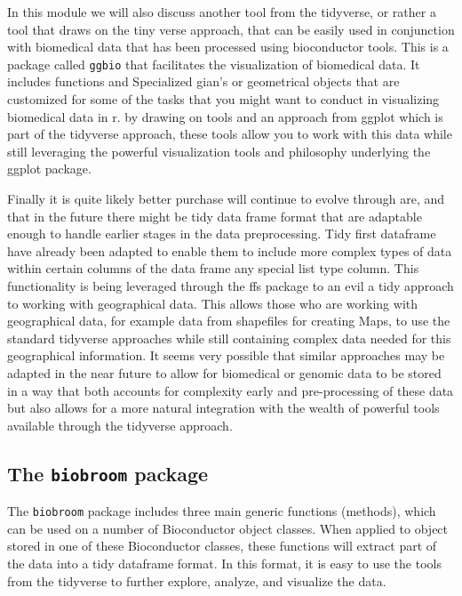 \documentclass[]{tufte-book}
\begin{document}
In this module we will also discuss another tool from the tidyverse, or rather a
tool that draws on the tiny verse approach, that can be easily used in
conjunction with biomedical data that has been processed using bioconductor
tools. This is a package called \texttt{ggbio} that facilitates the visualization of
biomedical data. It includes functions and Specialized gian's or geometrical
objects that are customized for some of the tasks that you might want to conduct
in visualizing biomedical data in r. by drawing on tools and an approach from
ggplot which is part of the tidyverse approach, these tools allow you to work
with this data while still leveraging the powerful visualization tools and
philosophy underlying the ggplot package.

Finally it is quite likely better purchase will continue to evolve through are,
and that in the future there might be tidy data frame format that are adaptable
enough to handle earlier stages in the data preprocessing. Tidy first dataframe
have already been adapted to enable them to include more complex types of data
within certain columns of the data frame any special list type column. This
functionality is being leveraged through the ffs package to an evil a tidy
approach to working with geographical data. This allows those who are working
with geographical data, for example data from shapefiles for creating Maps, to
use the standard tidyverse approaches while still containing complex data needed
for this geographical information. It seems very possible that similar
approaches may be adapted in the near future to allow for biomedical or genomic
data to be stored in a way that both accounts for complexity early and
pre-processing of these data but also allows for a more natural integration with
the wealth of powerful tools available through the tidyverse approach.

\hypertarget{the-biobroom-package}{%
\subsection{\texorpdfstring{The \texttt{biobroom} package}{The biobroom package}}\label{the-biobroom-package}}

The \texttt{biobroom} package includes three main generic functions (methods), which
can be used on a number of Bioconductor object classes. When applied to object
stored in one of these Bioconductor classes, these functions will extract part
of the data into a tidy dataframe format. In this format, it is easy to use the
tools from the tidyverse to further explore, analyze, and visualize the data.
\end{document}
